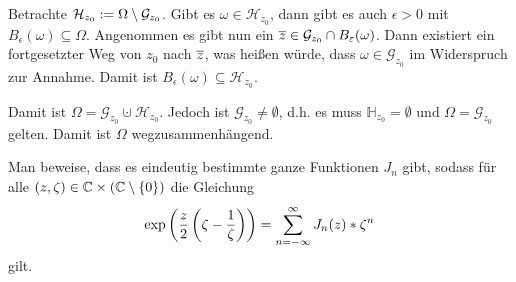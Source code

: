 \begin{exercisePage}
\begin{equivalence}
		Betrachte $\mathcal{H}_{z_0} \mathrel{:=} \Omega \setminus \mathcal{G}_{z_0}$. Gibt es $\omega \in \mathcal{H}_{z_0}$, dann gibt es auch $\epsilon > 0$ mit $B_\epsilon(\omega) \subseteq \Omega$. Angenommen es gibt nun ein $\overline{z} \in \mathcal{G}_{z_0} \cap B_\varepsilon(\omega)$. Dann existiert ein fortgesetzter Weg von $z_0$ nach $\overline{z}$, was heißen würde, dass $\omega \in \mathcal{G}_{z_0}$ im Widerspruch zur Annahme. Damit ist $B_\epsilon(\omega) \subseteq \mathcal{H}_{z_0}$. 
		
		Damit ist $\Omega = \mathcal{G}_{z_0} \cupdot \mathcal{H}_{z_0}$. Jedoch ist $\mathcal{G}_{z_0} \neq \emptyset$, d.h. es muss $\mathbb{H}_{z_0} = \emptyset$ und $\Omega = \mathcal{G}_{z_0}$ gelten. Damit ist $\Omega$ wegzusammenhängend.
	\end{equivalence}

	\begin{task}
		Man beweise, dass es eindeutig bestimmte ganze Funktionen $J_n$ gibt, sodass für alle $(z,\zeta) \in \mathbb{C} \times (\mathbb{C} \setminus \left\{ 0 \right\})$ die Gleichung
		\begin{equation*}
			\exp\left( \frac{z}{2} \left( \zeta - \frac{1}{\zeta} \right) \right) = \sum_{n = -\infty}^\infty J_n(z) * \zeta^n
		\end{equation*}
		gilt.
	\end{task}
\end{exercisePage}